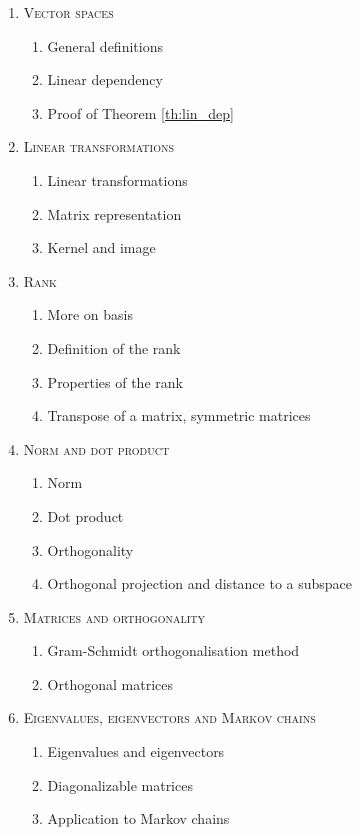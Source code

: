 \begin{enumerate}[label=\textbf{\arabic*.}]
\item \textsc{Vector spaces}
\begin{enumerate}[label=\arabic*.]
\item General definitions
\item Linear dependency
\item Proof of Theorem \ref{th:lin_dep}
\end{enumerate}
\item \textsc{Linear transformations}
\begin{enumerate}[label=\arabic*.]
\item Linear transformations
\item Matrix representation
\item Kernel and image
\end{enumerate}
\item \textsc{Rank}
\begin{enumerate}[label=\arabic*.]
\item More on basis
\item Definition of the rank
\item Properties of the rank
\item Transpose of a matrix, symmetric matrices
\end{enumerate}
\item \textsc{Norm and dot product}
\begin{enumerate}[label=\arabic*.]
\item Norm
\item Dot product
\item Orthogonality
\item Orthogonal projection and distance to a subspace
\end{enumerate}
\item \textsc{Matrices and orthogonality}
\begin{enumerate}[label=\arabic*.]
\item Gram-Schmidt orthogonalisation method
\item Orthogonal matrices
\end{enumerate}
\item \textsc{Eigenvalues, eigenvectors and Markov chains}
\begin{enumerate}[label=\arabic*.]
\item Eigenvalues and eigenvectors
\item Diagonalizable matrices
\item Application to Markov chains

\end{enumerate}
\end{enumerate}
